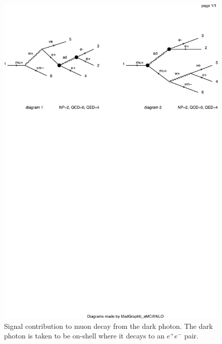 \begin{figure}[h]
    \centering
    \includegraphics[width=\textwidth,clip=true,viewport=0 500 500 700]{Figures/madgraph_diagrams/mu_eeenunu_darkphoton.pdf}
    \caption{Signal contribution to muon decay from the dark photon. The dark photon is taken to be on-shell where it decays to an $e^+ e^-$ pair.}
    \label{fig:mu_eee_darkphoton}
\end{figure}

